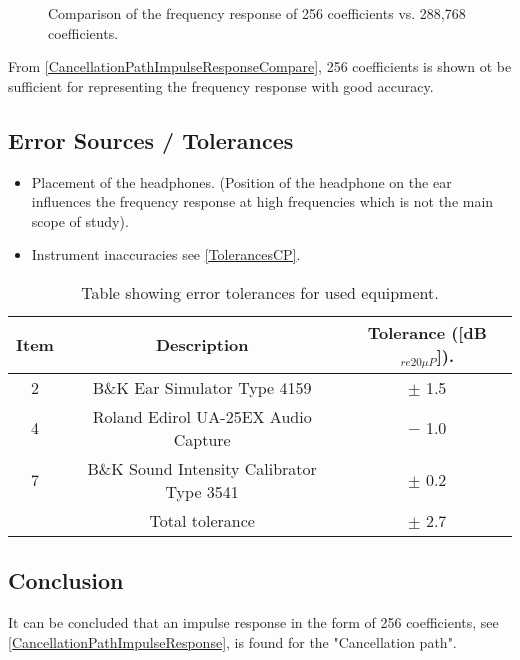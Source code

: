 \begin{figure}[H]
	\centering
	
	\caption{Comparison of the frequency response of 256 coefficients vs. 288,768 coefficients.}
	\label{CancellationPathImpulseResponseCompare}
\end{figure}

From \autoref{CancellationPathImpulseResponseCompare}, 256 coefficients is shown ot be sufficient for representing the frequency response with good accuracy. 

\subsection{Error Sources / Tolerances}
\begin{itemize}
	\item Placement of the headphones. (Position of the headphone on the ear  influences the frequency response at high frequencies which is not the main scope of study). 
	\item Instrument inaccuracies see \autoref{TolerancesCP}.
\end{itemize}

\begin{table}[H]
	\centering
	\begin{tabular}{ c c c } \toprule
		{Item}	& 		{Description} 	& {Tolerance ([dB$_{re20\mu P}$])}.	 \\ \bottomrule 
		2	&	B\&K Ear Simulator Type 4159				& $\pm$ 1.5 \cite{BK4159Tol} 	\\
		4	&	Roland Edirol UA-25EX Audio Capture			& $-$ 1.0 \cite{UA25EXTol}	\\
		7	&	B\&K Sound Intensity Calibrator Type 3541	& $\pm$ 0.2	\cite{BK3541Tol} \\ \bottomrule
			&	Total tolerance								& $\pm$ 2.7	\\ \bottomrule	
	\end{tabular}
	\caption{Table showing error tolerances for used equipment.}
	\label{TolerancesCP}
\end{table}

\subsection{Conclusion}
It can be concluded that an impulse response in the form of 256 coefficients, see \autoref{CancellationPathImpulseResponse}, is found for the "Cancellation path". %

